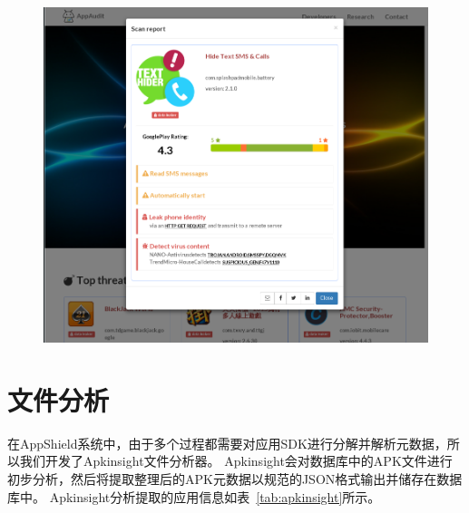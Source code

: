 \begin{figure}
	\centering
	\includegraphics[width=1\textwidth]{figure/appaudit-sample.png}
\end{figure}

\section{文件分析}
\label{sec:appshield:file-analyze}

在AppShield系统中，由于多个过程都需要对应用SDK进行分解并解析元数据，所以我们开发了Apkinsight文件分析器。
Apkinsight会对数据库中的APK文件进行初步分析，然后将提取整理后的APK元数据以规范的JSON格式输出并储存在数据库中。
Apkinsight分析提取的应用信息如表~\ref{tab:apkinsight}所示。


